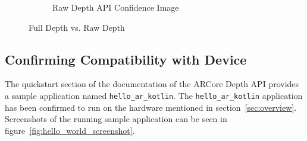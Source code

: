 \begin{figure}[ht!]
\begin{subfigure}[b]{0.4\textwidth}
        \caption{Raw Depth API Confidence Image}
    \end{subfigure}%

    \caption{Full Depth vs. Raw Depth}
    \label{fig:depth-api-images}
\end{figure}


\subsection{Confirming Compatibility with Device}

The quickstart section of the documentation of the ARCore Depth API \parencite{arcore-depth-quickstart} provides a sample application named \texttt{hello\_ar\_kotlin}.
The \texttt{hello\_ar\_kotlin} application has been confirmed to run on the hardware mentioned in section~\ref{sec:overview}.
Screenshots of the running sample application can be seen in figure~\ref{fig:hello_world_screenshot}.


